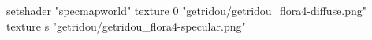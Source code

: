 setshader "specmapworld"
texture 0 "getridou/getridou_flora4-diffuse.png"
texture s "getridou/getridou_flora4-specular.png"
